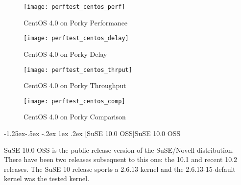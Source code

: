 \documentclass[letterpaper,final,notitlepage,twocolumn,10pt,twoside]{article}
\makeatletter
\let\normalsize\small
\let\small\footnotesize
\let\footnotesize\scriptsize
\let\scriptsize\tiny
\renewcommand\subsubsection{\@startsection{subsubsection}{3}{\z@}%
                                     {-1.25ex\@plus -.5ex \@minus -.2ex}%
                                     {1ex \@plus .2ex}%
                                     {\normalfont\normalsize\bfseries}}
\makeatother
\begin{document}
\begin{figure}[p]
\texttt{[image: perftest\_centos\_perf]}
\caption[CentOS 4.0 on Porky Performance]{CentOS 4.0 on Porky Performance}
\label{figure:centosperf}
\end{figure}

\begin{figure}[p]
\texttt{[image: perftest\_centos\_delay]}
\caption[CentOS 4.0 on Porky Delay]{CentOS 4.0 on Porky Delay}
\label{figure:centosdelay}
\end{figure}

\begin{figure}[p]
\texttt{[image: perftest\_centos\_thrput]}
\caption[CentOS 4.0 on Porky Throughput]{CentOS 4.0 on Porky Throughput}
\label{figure:centosthrput}
\end{figure}

\begin{figure}[p]
\texttt{[image: perftest\_centos\_comp]}
\caption[CentOS 4.0 on Porky Comparison]{CentOS 4.0 on Porky Comparison}
\label{figure:centoscomp}
\end{figure}

\subsubsection[SuSE 10.0 OSS]{SuSE 10.0 OSS}

SuSE 10.0 OSS is the public release version of the SuSE/Novell distribution.
There have been two releases subsequent to this one: the 10.1 and recent 10.2
releases.  The SuSE 10 release sports a 2.6.13 kernel and the
2.6.13-15-default kernel was the tested kernel.
\end{document}
